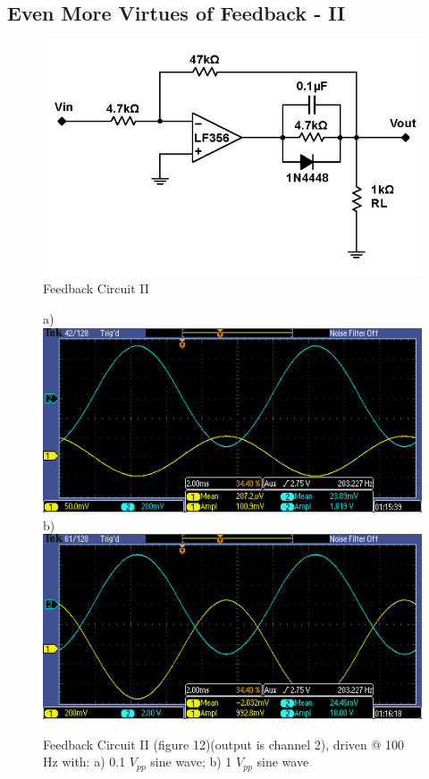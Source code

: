 \documentclass{article}
\begin{document}
\subsection{Even More Virtues of Feedback - II}
    \begin{figure}[H]
        \centering
        \includegraphics[scale = 0.5]{8.png}
        \caption{Feedback Circuit II ~\cite{webfig}}
        \label{fig:my_label}
    \end{figure}
    \begin{figure}[H]
        \centering
        a)\includegraphics[scale = 0.7]{8a.PNG}
        b)\includegraphics[scale = 0.7]{8b.PNG}
        \caption{Feedback Circuit II (figure 12)(output is channel 2), driven @ 100 Hz with: a) 0.1 $V_{pp}$ sine wave; b) 1 $V_{pp}$ sine wave}
        \label{fig:my_label}
    \end{figure}
\end{document}
